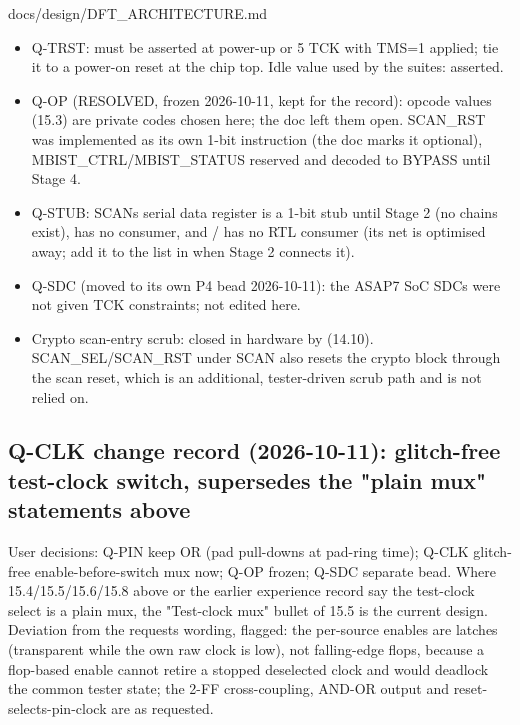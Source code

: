 \begin{relocated}{docs/design/DFT_ARCHITECTURE.md}
\begin{itemize}
\tightlist
\item
  Q-TRST:  must be asserted at power-up or 5 TCK with
  TMS=1 applied; tie it to a power-on reset at the chip top. Idle value
  used by the suites: asserted.
\item
  Q-OP (RESOLVED, frozen 2026-10-11, kept for the record): opcode values
  (15.3) are private codes chosen here; the doc left them open.
  SCAN\_RST was implemented as its own 1-bit instruction (the doc marks
  it optional),
  MBIST\_\allowbreak{}CTRL/\allowbreak{}MBIST\_\allowbreak{}STATUS
  reserved and decoded to BYPASS until Stage 4.
\item
  Q-STUB: SCAN\textquotesingle s serial data register is a 1-bit stub
  until Stage 2 (no chains exist),  has no consumer, and
  / has no RTL consumer (its net is
  optimised away; add it to the  list in
   when Stage 2 connects it).
\item
  Q-SDC (moved to its own P4 bead 2026-10-11): the ASAP7 SoC SDCs were
  not given TCK constraints; not edited here.
\item
  Crypto scan-entry scrub: closed in hardware by  (14.10).
  SCAN\_\allowbreak{}SEL/\allowbreak{}SCAN\_\allowbreak{}RST under SCAN
  also resets the crypto block through the scan reset, which is an
  additional, tester-driven scrub path and is not relied on.
\end{itemize}

\subsection{Q-CLK change record (2026-10-11): glitch-free
test-clock switch, supersedes the "plain mux" statements above}\label{tm:ch:dft-architecture:159-q-clk-change-record-2026-10-11-glitch-free-test-clock-switch-supersedes-the-plain-mux-statements-above}

User decisions: Q-PIN keep OR (pad pull-downs at pad-ring time); Q-CLK
glitch-free enable-before-switch mux now; Q-OP frozen; Q-SDC separate
bead. Where 15.4/\allowbreak{}15.5/\allowbreak{}15.6/\allowbreak{}15.8
above or the earlier experience record say the test-clock select is a
plain mux, the "Test-clock mux" bullet of 15.5 is the current design.
Deviation from the request\textquotesingle s wording, flagged: the
per-source enables are latches (transparent while the own raw clock is
low), not falling-edge flops, because a flop-based enable cannot retire
a stopped deselected clock and would deadlock the common tester state;
the 2-FF cross-coupling, AND-OR output and reset-selects-pin-clock are
as requested.


\end{relocated}
